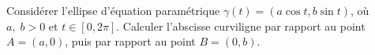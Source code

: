 \begin{exercice}\label{exoCourbesSurfaces0009}

Considérer l'ellipse d'équation paramétrique $\gamma(t) = ( a \cos t, b \sin t)$, où $ a, \; b > 0$ et  $ t \in [0, 2 \pi]$. Calculer l'abscisse curviligne par rapport au point $A = (a,0)$, puis par rapport au point $ B = (0, b)$.  

\end{exercice}
